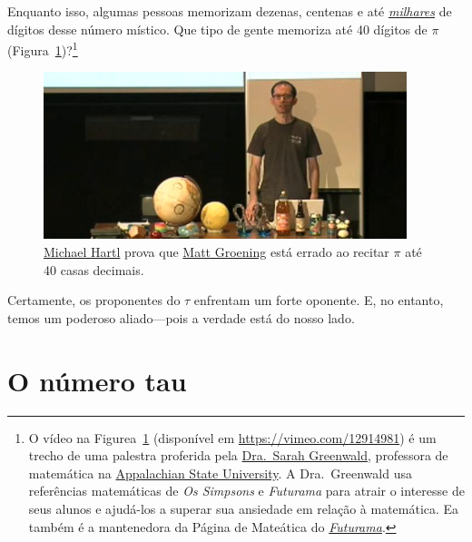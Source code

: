 Enquanto isso, algumas pessoas memorizam dezenas, centenas e até \href{https://www.guinnessworldrecords.com/world-records/most-pi-places-memorised}{\emph{milhares}} de dígitos desse número místico. Que tipo de gente memoriza até 40 dígitos de $\pi$ (Figura~\ref{fig:futurama_video})?\footnote{O vídeo na Figurea~\ref{fig:futurama_video} (disponível em \href{https://vimeo.com/12914981}{https://vimeo.com/12914981}) é um trecho de uma palestra proferida pela \href{https://cs.appstate.edu/~sjg/}{Dra.\ Sarah Greenwald}, professora de matemática na \href{https://www.appstate.edu/}{Appalachian State University}. A Dra.\ Greenwald usa referências matemáticas de \emph{Os Simpsons} e \emph{Futurama} para atrair o interesse de seus alunos e ajudá-los a superar sua ansiedade em relação à matemática. Ea também é a mantenedora da Página de Mateática do \href{https://cs.appstate.edu/~sjg/futurama/}{\emph{Futurama}}.}

\begin{figure}
\begin{center}
\includegraphics{images/figures/futurama_math_lecture.png} %
\end{center}
\caption{\href{https://tauday.com/tau-manifesto/\#sec-about_the_author}{Michael Hartl} prova que \href{https://en.wikipedia.org/wiki/Matt_Groening}{Matt Groening} está errado ao recitar $\pi$ até 40 casas decimais.\label{fig:futurama_video}}
\end{figure}

Certamente, os proponentes do $\tau$ enfrentam um forte oponente. E, no entanto, temos um poderoso aliado---pois a verdade está do nosso lado.


\section{O número tau} %
\label{sec:the_number_tau}

